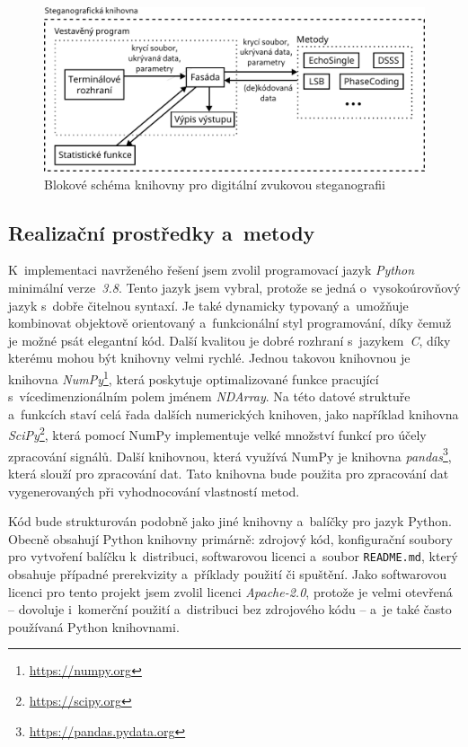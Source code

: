 \begin{figure}[hbt]
    \centering
    \includegraphics[width=\textwidth]{obrazky/block-diagram.pdf}
    \caption{Blokové schéma knihovny pro digitální zvukovou steganografii}
    \label{pic:library-block-diagram}
\end{figure}

\subsection*{Realizační prostředky a~metody}
\label{sub:solution-tool-choices}

K~implementaci navrženého řešení jsem zvolil programovací jazyk \textit{Python}
minimální verze~\textit{3.8}. Tento jazyk jsem vybral, protože se jedná
o~vysokoúrovňový jazyk s~dobře čitelnou syntaxí. Je také dynamicky typovaný
a~umožňuje kombinovat objektově orientovaný a~funkcionální styl programování,
díky čemuž je možné psát elegantní kód. Další kvalitou je dobré rozhraní
s~jazykem~\textit{C}, díky kterému mohou být knihovny velmi rychlé. Jednou
takovou knihovnou je knihovna \textit{NumPy}\footnote{\url{https://numpy.org}},
která poskytuje optimalizované funkce pracující s~vícedimenzionálním polem
jménem \textit{NDArray}. Na této datové struktuře a~funkcích staví celá řada
dalších numerických knihoven, jako například knihovna
\textit{SciPy}\footnote{\url{https://scipy.org}}, která pomocí NumPy
implementuje velké množství funkcí pro účely zpracování signálů. Další
knihovnou, která využívá NumPy je knihovna
\textit{pandas}\footnote{\url{https://pandas.pydata.org}}, která slouží pro
zpracování dat. Tato knihovna bude použita pro zpracování dat vygenerovaných
při vyhodnocování vlastností metod.

Kód bude strukturován podobně jako jiné knihovny a~balíčky pro jazyk Python.
Obecně obsahují Python knihovny primárně: zdrojový kód, konfigurační soubory
pro vytvoření balíčku k~distribuci, softwarovou licenci a~soubor
\texttt{README.md}, který obsahuje případné prerekvizity a~příklady použití či
spuštění. Jako softwarovou licenci pro tento projekt jsem zvolil licenci
\textit{Apache-2.0}, protože je velmi otevřená -- dovoluje i~komerční použití
a~distribuci bez zdrojového kódu -- a~je také často používaná Python
knihovnami.

